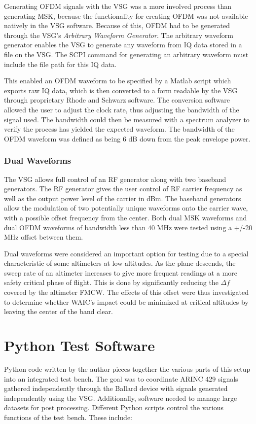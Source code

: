 Generating OFDM signals with the VSG was a more involved process than generating MSK, because the functionality for creating OFDM was not available natively in the VSG software. Because of this, OFDM had to be generated through the VSG's \textit{Arbitrary Waveform Generator}. The arbitrary waveform generator enables the VSG to generate any waveform from IQ data stored in a file on the VSG. The SCPI command for generating an arbitrary waveform must include the file path for this IQ data.  

This enabled an OFDM waveform to be specified by a Matlab script which exports raw IQ data, which is then converted to a form readable by the VSG through proprietary Rhode and Schwarz software. The conversion software allowed the user to adjust the clock rate, thus adjusting the bandwidth of the signal used. The bandwidth could then be measured with a spectrum analyzer to verify the process has yielded the expected waveform. The bandwidth of the OFDM waveform was defined as being 6 dB down from the peak envelope power. 


\subsubsection{Dual Waveforms}\label{subsub:Dual}
The VSG allows full control of an RF generator along with two baseband generators. The RF generator gives the user control of RF carrier frequency as well as the output power level of the carrier in dBm. The baseband generators allow the modulation of two potentially unique waveforms onto the carrier wave, with a possible offset frequency from the center. Both dual MSK waveforms and dual OFDM waveforms of bandwidth less than 40 MHz were tested using a +/-20 MHz offset between them. 

Dual waveforms were considered an important option for testing due to a special characteristic of some altimeters at low altitudes. As the plane descends, the sweep rate of an altimeter increases to give more frequent readings at a more safety critical phase of flight. This is done by significantly reducing the $\Delta f$ covered by the altimeter FMCW. The effects of this offset were thus investigated to determine whether WAIC's impact could be minimized at critical altitudes by leaving the center of the band clear. 


\section{Python Test Software}\label{sec:Python}
Python code written by the author pieces together the various parts of this setup into an integrated test bench. The goal was to coordinate ARINC 429 signals gathered independently through the Ballard device with signals generated independently using the VSG. Additionally, software needed to manage large datasets for post processing. Different Python scripts control the various functions of the test bench. These include:

